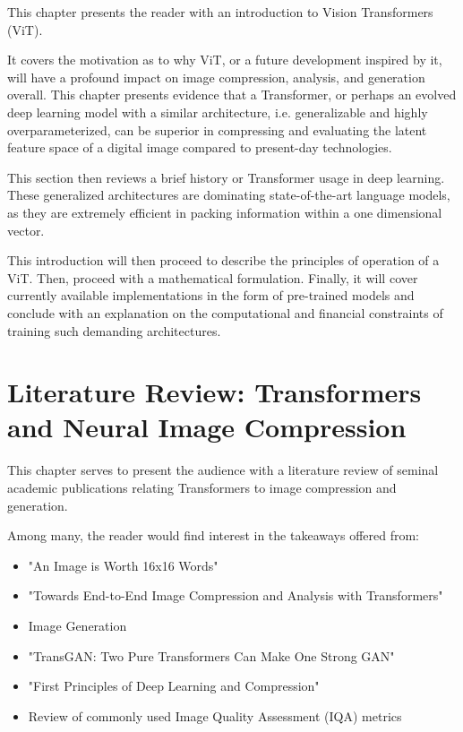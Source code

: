 \documentclass[pdftex,11pt,titlepage,twoside,openright]{report}
\begin{document}
This chapter presents the reader with an introduction to Vision Transformers (ViT).

It covers the motivation as to why ViT, or a future development inspired by it,
will have a profound impact on image compression, analysis, and generation overall.
This chapter presents evidence that a Transformer, or perhaps an evolved deep learning model with a
similar architecture, i.e. generalizable and highly overparameterized, can be superior in
compressing and evaluating the latent feature space of a digital image compared to present-day
technologies.

This section then reviews a brief history or Transformer usage in deep learning.
These generalized architectures are dominating state-of-the-art language models,
as they are extremely efficient in packing information within a one dimensional vector.

This introduction will then proceed to describe the principles of operation of a ViT. Then, proceed with
a mathematical formulation. Finally, it will cover currently available implementations
in the form of pre-trained models and conclude with an explanation on the computational and
financial constraints of training such demanding architectures.

\ThinHRule

\newpage



\chapter{Literature Review: Transformers and Neural Image Compression}


This chapter serves to present the audience with a literature review of seminal academic
publications relating Transformers to image compression and generation.

Among many, the reader would find interest in the takeaways offered from:

\begin{itemize}
	\item "An Image is Worth 16x16 Words" \citep{dosovitskiy2020vit}
	\item "Towards End-to-End Image Compression and Analysis with Transformers" 
    
    \citep{Bai2022AAAI}
    \item Image Generation
	\item "TransGAN: Two Pure Transformers Can Make One Strong GAN" \citep{jiang2021transgan}
	\item "First Principles of Deep Learning and Compression" \citep{Principles}
	\item Review of commonly used Image Quality Assessment (IQA) metrics \citep{BRISQUE}
    
    \citep{Metrics}
\end{itemize}
\end{document}
